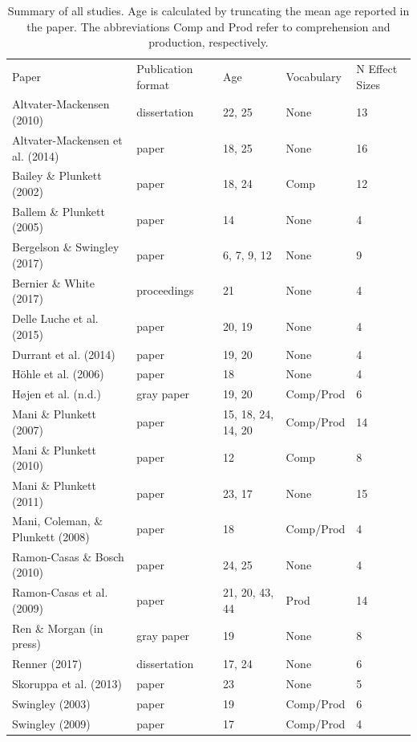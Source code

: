 \documentclass[man]{apa6}
\makeatletter
\newenvironment{lltable}{\begin{landscape}\begin{center}\begin{ThreePartTable}}{\end{ThreePartTable}\end{center}\end{landscape}}
\newcommand\LastLTentrywidth{1em}
\newlength\longtablewidth
\newcommand{\getlongtablewidth}{\begingroup \ifcsname LT@\roman{LT@tables}\endcsname \global\longtablewidth=0pt \renewcommand{\LT@entry}[2]{\global\advance\longtablewidth by ##2\relax\gdef\LastLTentrywidth{##2}}\@nameuse{LT@\roman{LT@tables}} \fi \endgroup}
\theoremstyle{definition}
\theoremstyle{definition}
\theoremstyle{definition}
\theoremstyle{remark}
\makeatother
\begin{document}
\begin{lltable}


\begin{longtable}{lllll}\noalign{\getlongtablewidth\global\LTcapwidth=\longtablewidth}
\caption{\label{tab:SummaryTable}Summary of all studies. Age is calculated by truncating the mean age reported in the paper. The abbreviations Comp and Prod refer to comprehension and production, respectively.}\\
\toprule
Paper & Publication format & Age & Vocabulary & N Effect Sizes\\
\midrule
Altvater-Mackensen (2010) & dissertation & 22, 25 & None & 13\\
Altvater-Mackensen et al. (2014) & paper & 18, 25 & None & 16\\
Bailey \& Plunkett (2002) & paper & 18, 24 & Comp & 12\\
Ballem \& Plunkett (2005) & paper & 14 & None & 4\\
Bergelson \& Swingley (2017) & paper & 6, 7, 9, 12 & None & 9\\
Bernier \& White (2017) & proceedings & 21 & None & 4\\
Delle Luche et al. (2015) & paper & 20, 19 & None & 4\\
Durrant et al. (2014) & paper & 19, 20 & None & 4\\
Höhle et al. (2006) & paper & 18 & None & 4\\
Højen et al. (n.d.) & gray paper & 19, 20 & Comp/Prod & 6\\
Mani \& Plunkett (2007) & paper & 15, 18, 24, 14, 20 & Comp/Prod & 14\\
Mani \& Plunkett (2010) & paper & 12 & Comp & 8\\
Mani \& Plunkett (2011) & paper & 23, 17 & None & 15\\
Mani, Coleman, \& Plunkett (2008) & paper & 18 & Comp/Prod & 4\\
Ramon-Casas \& Bosch (2010) & paper & 24, 25 & None & 4\\
Ramon-Casas et al. (2009) & paper & 21, 20, 43, 44 & Prod & 14\\
Ren \& Morgan (in press) & gray paper & 19 & None & 8\\
Renner (2017) & dissertation & 17, 24 & None & 6\\
Skoruppa et al. (2013) & paper & 23 & None & 5\\
Swingley (2003) & paper & 19 & Comp/Prod & 6\\
Swingley (2009) & paper & 17 & Comp/Prod & 4\\

\end{longtable}
\end{lltable}
\end{document}
